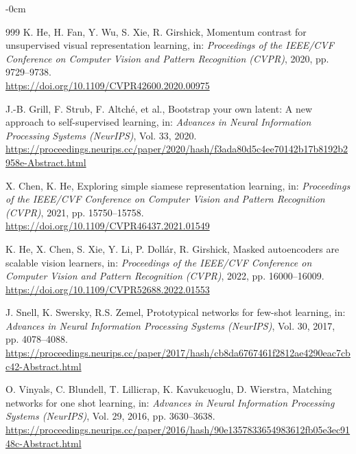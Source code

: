 \documentclass[sensors,article,submit,moreauthors]{Definitions/mdpi}
\begin{document}
\begin{adjustwidth}{-\extralength}{0cm}
\begin{thebibliography}{999}
K. He, H. Fan, Y. Wu, S. Xie, R. Girshick, Momentum contrast for unsupervised visual representation learning, in: \textit{Proceedings of the IEEE/CVF Conference on Computer Vision and Pattern Recognition (CVPR)}, 2020, pp. 9729--9738. \\
\url{https://doi.org/10.1109/CVPR42600.2020.00975}



J.-B. Grill, F. Strub, F. Altch\'e, et al., Bootstrap your own latent: A new approach to self-supervised learning, in: \textit{Advances in Neural Information Processing Systems (NeurIPS)}, Vol. 33, 2020. \\
\url{https://proceedings.neurips.cc/paper/2020/hash/f3ada80d5c4ee70142b17b8192b2958e-Abstract.html}



X. Chen, K. He, Exploring simple siamese representation learning, in: \textit{Proceedings of the IEEE/CVF Conference on Computer Vision and Pattern Recognition (CVPR)}, 2021, pp. 15750--15758. \\
\url{https://doi.org/10.1109/CVPR46437.2021.01549}



K. He, X. Chen, S. Xie, Y. Li, P. Doll\'ar, R. Girshick, Masked autoencoders are scalable vision learners, in: \textit{Proceedings of the IEEE/CVF Conference on Computer Vision and Pattern Recognition (CVPR)}, 2022, pp. 16000--16009. \\
\url{https://doi.org/10.1109/CVPR52688.2022.01553}



J. Snell, K. Swersky, R.S. Zemel, Prototypical networks for few-shot learning, in: \textit{Advances in Neural Information Processing Systems (NeurIPS)}, Vol. 30, 2017, pp. 4078--4088. \\
\url{https://proceedings.neurips.cc/paper/2017/hash/cb8da6767461f2812ae4290eac7cbc42-Abstract.html}



O. Vinyals, C. Blundell, T. Lillicrap, K. Kavukcuoglu, D. Wierstra, Matching networks for one shot learning, in: \textit{Advances in Neural Information Processing Systems (NeurIPS)}, Vol. 29, 2016, pp. 3630--3638. \\
\url{https://proceedings.neurips.cc/paper/2016/hash/90e1357833654983612fb05e3ec9148c-Abstract.html}




\end{thebibliography}
\end{adjustwidth}
\end{document}
